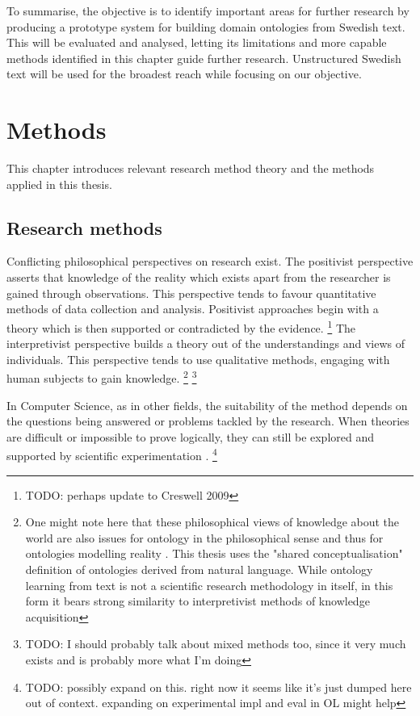 \documentclass[a4paper]{report}
\newcommand{\todo}[1]{\footnote{{\color{red} TODO: #1}}}
\begin{document}
To summarise, the objective is to identify important areas for further research by producing a prototype system for building domain ontologies from Swedish text. This will be evaluated and analysed, letting its limitations and more capable methods identified in this chapter guide further research. Unstructured Swedish text will be used for the broadest reach while focusing on our objective.

\chapter{Methods}

This chapter introduces relevant research method theory and the methods applied in this thesis.

\section{Research methods}
\label{sec:methods:research}
Conflicting philosophical perspectives on research exist.
The positivist perspective asserts that knowledge of the reality which exists apart from the researcher is gained through observations.
This perspective tends to favour quantitative methods of data collection and analysis.
Positivist approaches begin with a theory which is then supported or contradicted by the evidence.
\cite[p.6-7]{creswell2003research}\todo{perhaps update to Creswell 2009}
The interpretivist perspective builds a theory out of the understandings and views of individuals.
This perspective tends to use qualitative methods, engaging with human subjects to gain knowledge.
\cite[p.7-9]{creswell2003research}
\footnote{One might note here that these philosophical views of knowledge about the world are also issues for ontology in the philosophical sense and thus for ontologies modelling reality \cite[p.6]{creswell2003research}\cite{sep-hermeneutics}.
This thesis uses the "shared conceptualisation" definition of ontologies derived from natural language.
While ontology learning from text is not a scientific research methodology in itself, in this form it bears strong similarity to interpretivist methods of knowledge acquisition}
\todo{I should probably talk about mixed methods too, since it very much exists and is probably more what I'm doing}

In Computer Science, as in other fields, the suitability  of the method depends on the questions being answered or problems tackled by the research.
When theories are difficult or impossible to prove logically, they can still be explored and supported by scientific experimentation \cite{Blomqvist09Thesis,Crnkovic2002SciMethCS}.
\todo{possibly expand on this. right now it seems like it's just dumped here out of context. expanding on experimental impl and eval in OL might help}
\end{document}
